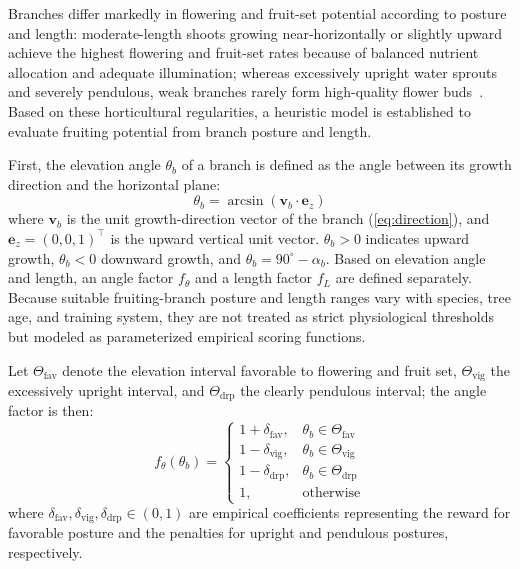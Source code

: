 \documentclass[12pt,a4paper,fontset=fandol]{ctexart}
\newcommand{\vb}[1][b]{\mathbf{v}_{#1}}
\begin{document}
Branches differ markedly in flowering and fruit-set potential according to posture and length:
moderate-length shoots growing near-horizontally or slightly upward achieve the highest flowering and fruit-set rates
because of balanced nutrient allocation and adequate illumination;
whereas excessively upright water sprouts and severely pendulous, weak branches rarely form high-quality flower buds~\citep{he2018review,kim2025pear,li2025pear}.
Based on these horticultural regularities,
a heuristic model is established to evaluate fruiting potential from branch posture and length.

First, the elevation angle $\theta_b$ of a branch is defined as the angle between its growth direction and the horizontal plane:
\begin{equation}\label{eq:elevation}
  \theta_b = \arcsin(\vb \cdot \mathbf{e}_z)
\end{equation}
where $\vb$ is the unit growth-direction vector of the branch (\cref{eq:direction}),
and $\mathbf{e}_z = (0, 0, 1)^{\!\top}$ is the upward vertical unit vector.
$\theta_b > 0$ indicates upward growth, $\theta_b < 0$ downward growth, and $\theta_b = 90^\circ - \alpha_b$.
Based on elevation angle and length, an angle factor $f_\theta$ and a length factor $f_L$ are defined separately.
Because suitable fruiting-branch posture and length ranges vary with species, tree age, and training system,
they are not treated as strict physiological thresholds but modeled as parameterized empirical scoring functions.

Let $\Theta_{\text{fav}}$ denote the elevation interval favorable to flowering and fruit set,
$\Theta_{\text{vig}}$ the excessively upright interval,
and $\Theta_{\text{drp}}$ the clearly pendulous interval; the angle factor is then:
\begin{equation}\label{eq:angle_factor}
  f_\theta(\theta_b) =
  \begin{cases}
    1 + \delta_{\text{fav}}, & \theta_b \in \Theta_{\text{fav}} \\
    1 - \delta_{\text{vig}}, & \theta_b \in \Theta_{\text{vig}} \\
    1 - \delta_{\text{drp}}, & \theta_b \in \Theta_{\text{drp}} \\
    1, & \text{otherwise}
  \end{cases}
\end{equation}
where $\delta_{\text{fav}}, \delta_{\text{vig}}, \delta_{\text{drp}} \in (0,1)$ are empirical coefficients
representing the reward for favorable posture and the penalties for upright and pendulous postures, respectively.
\end{document}
